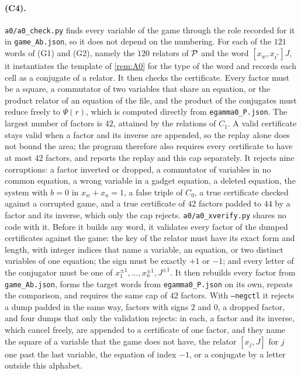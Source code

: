 \paragraph{(C4).} \texttt{a0/a0\_check.py} finds every variable of the game through the role recorded for it in \texttt{game\_Ab.json},
so it does not depend on the numbering. For each of the $121$ words of (G1) and (G2), namely the $120$ relators of $\mathcal P$ and the word
$[x_w,x_{t^*}]J$, it instantiates the template of \cref{rem:A0} for the type of the word and records each cell as a conjugate of a
relator. It then checks the certificate. Every factor must be a square, a commutator of two variables that share an equation, or the
product relator of an equation of the file, and the product of the conjugates must reduce freely to $\Psi(r)$, which is computed directly
from \texttt{egamma0\_P.json}. The largest number of factors is $42$, attained by the relations of $C_1$. A valid certificate stays valid
when a factor and its inverse are appended, so the replay alone does not bound the area; the program therefore also requires every
certificate to have at most $42$ factors, and reports the replay and this cap separately. It rejects nine corruptions: a factor inverted or
dropped, a commutator of variables in no common equation, a wrong variable in a gadget equation, a deleted equation, the system with $b=0$
in $x_w+x_u=1$, a false triple of $C_0$, a true certificate checked against a corrupted game, and a true certificate of $42$ factors padded
to $44$ by a factor and its inverse, which only the cap rejects. \texttt{a0/a0\_xverify.py} shares no code with it. Before it builds any
word, it validates every factor of the dumped certificates against the game: the key of the relator must have its exact form and length,
with integer indices that name a variable, an equation, or two distinct variables of one equation; the sign must be exactly $+1$ or $-1$;
and every letter of the conjugator must be one of $x_1^{\pm1},\dots,x_n^{\pm1},J^{\pm1}$. It then rebuilds every factor from
\texttt{game\_Ab.json}, forms the target words from \texttt{egamma0\_P.json} on its own, repeats the comparison, and requires the same cap of
$42$ factors. With \texttt{--negctl} it rejects a dump padded in the same way, factors with signs $2$ and $0$, a dropped factor, and four
dumps that only the validation rejects: in each, a factor and its inverse, which cancel freely, are appended to a certificate of one
factor, and they name the square of a variable that the game does not have, the relator $[x_j,J]$ for $j$ one past the last variable, the
equation of index $-1$, or a conjugate by a letter outside this alphabet.

